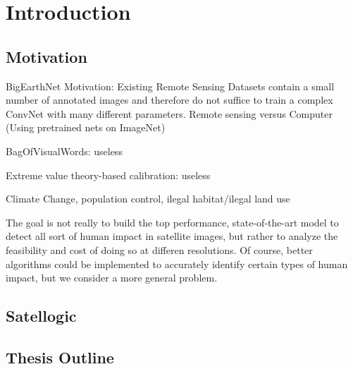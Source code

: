 
\chapter{Introduction}

\label{Chapter1}


\section{Motivation}

BigEarthNet Motivation:
Existing Remote Sensing Datasets contain a small number of annotated images and therefore do not suffice to train a complex ConvNet with many different parameters.
Remote sensing versus Computer (Using pretrained nets on ImageNet)


BagOfVisualWords: useless



Extreme value theory-based calibration: useless




Climate Change, population control, ilegal habitat/ilegal land use


The goal is not really to build the top performance, state-of-the-art model to detect all sort of human impact in satellite images, but rather to analyze the feasibility and cost of doing so at differen resolutions. Of course, better algorithms could be implemented to accurately identify certain types of human impact, but we consider a more general problem.


\section{Satellogic}


\section{Thesis Outline}